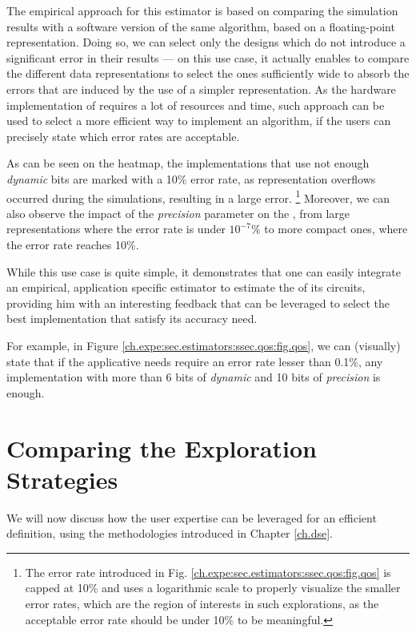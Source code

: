         The empirical approach for this estimator is based on comparing the simulation results with a software version of the same algorithm, based on a floating-point representation.
        Doing so, we can select only the designs which do not introduce a significant error in their results --- on this use case, it actually enables to compare the different data representations to select the ones sufficiently wide to absorb the errors that are induced by the use of a simpler representation.
        As the hardware implementation of  requires a lot of resources and time, such approach can be used to select a more efficient way to implement an algorithm, if the users can precisely state which error rates are acceptable.

\clearpage
        As can be seen on the heatmap, the implementations that use not enough {\it dynamic} bits are marked with a 10\% error rate, as representation overflows occurred during the simulations, resulting in a large error.%
        \footnote{The error rate introduced in Fig. \ref{ch.expe:sec.estimators:ssec.qos:fig.qos} is capped at 10\% and uses a logarithmic scale to properly visualize the smaller error rates, which are the region of interests in such explorations, as the acceptable error rate should be under 10\% to be meaningful.}
        Moreover, we can also observe the impact of the {\it precision} parameter on the , from large representations where the error rate is under $10^{-7}\%$ to more compact ones, where the error rate reaches 10\%.

        While this use case is quite simple, it demonstrates that one can easily integrate an empirical, application specific estimator to estimate the  of its circuits, providing him with an interesting feedback that can be leveraged to select the best implementation that satisfy its accuracy need.

        For example, in Figure \ref{ch.expe:sec.estimators:ssec.qos:fig.qos}, we can (visually) state that if the applicative needs require an error rate lesser than 0.1\%, any implementation with more than 6 bits of {\it dynamic} and 10 bits of {\it precision} is enough.
    

\section{Comparing the Exploration Strategies}
\label{ch.expe:sec.strategies}
    We will now discuss how the user expertise can be leveraged for an efficient  definition, using the methodologies introduced in Chapter \ref{ch.dse}.

